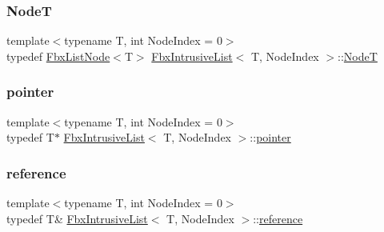 \mbox{\label{class_fbx_intrusive_list_a6ffda382a6d029a042cbb0110853680c}} 
\subsubsection{\texorpdfstring{NodeT}{NodeT}}
{\footnotesize\ttfamily template$<$typename T, int Node\+Index = 0$>$ \\
typedef \hyperlink{class_fbx_list_node}{Fbx\+List\+Node}$<$T$>$ \hyperlink{class_fbx_intrusive_list}{Fbx\+Intrusive\+List}$<$ T, Node\+Index $>$\+::\hyperlink{class_fbx_intrusive_list_a6ffda382a6d029a042cbb0110853680c}{NodeT}}

\mbox{\label{class_fbx_intrusive_list_ad04ad10d67ddd0d4104b172839c908d7}} 
\subsubsection{\texorpdfstring{pointer}{pointer}}
{\footnotesize\ttfamily template$<$typename T, int Node\+Index = 0$>$ \\
typedef T$\ast$ \hyperlink{class_fbx_intrusive_list}{Fbx\+Intrusive\+List}$<$ T, Node\+Index $>$\+::\hyperlink{class_fbx_intrusive_list_ad04ad10d67ddd0d4104b172839c908d7}{pointer}}

\mbox{\label{class_fbx_intrusive_list_aa927f048081371fe74dff673d3a5a8ad}} 
\subsubsection{\texorpdfstring{reference}{reference}}
{\footnotesize\ttfamily template$<$typename T, int Node\+Index = 0$>$ \\
typedef T\& \hyperlink{class_fbx_intrusive_list}{Fbx\+Intrusive\+List}$<$ T, Node\+Index $>$\+::\hyperlink{class_fbx_intrusive_list_aa927f048081371fe74dff673d3a5a8ad}{reference}}

\mbox{\label{class_fbx_intrusive_list_a218aebbf21a304ade2a570f47da62751}} 

